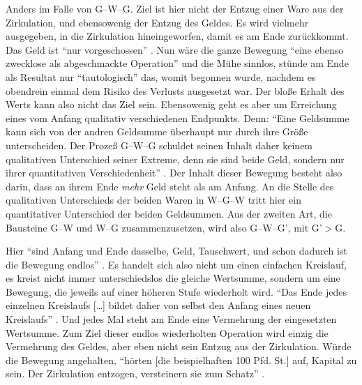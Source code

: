 \documentclass[12pt,
               DIV13,
               paper=a4,
               twoside=false,
               onehalfspacing,
               bibliography=totoc,
               toc=graduated,
               draft,
               ]{scrartcl}
\newcommand{\lips}{\dots\unkern}
\newcommand{\pc}[2]{\parencite[#1]{#2}}
\newcommand{\vgl}[2]{\parencite[vgl.][#1]{#2}}
\newcommand{\worries}[1]{\ifdraft{\textcolor{blue}{\texttt{(#1)}}}{}}
\newcommand{\gwg}{G--W--G'\xspace}
\newcommand{\wgw}{W--G--W\xspace}
\begin{document}
Anders im Falle von G--W--G. Ziel ist hier nicht der Entzug einer Ware
aus der Zirkulation, und ebensowenig der Entzug des Geldes. Es wird
vielmehr ausgegeben, in die Zirkulation hineingeworfen, damit es am
Ende zurückkommt. Das Geld ist "`nur vorgeschossen"' \pc{163}{kap}.
Nun wäre die ganze Bewegung "`eine ebenso zwecklose als abgeschmackte
Operation"' \pc{165}{kap} und die Mühe sinnlos, stünde am Ende als
Resultat nur "`tautologisch"' \pc{164}{kap} das, womit begonnen wurde,
nachdem es obendrein einmal dem Risiko des Verlusts ausgesetzt war.
Der bloße Erhalt des Werts kann also nicht das Ziel sein. Ebensowenig
geht es aber um Erreichung eines vom Anfang qualitativ verschiedenen
Endpunkts. Denn: "`Eine Geldsumme kann sich von der andren Geldsumme
überhaupt nur durch ihre Größe unterscheiden. Der Prozeß G--W--G
schuldet seinen Inhalt daher keinem qualitativen Unterschied seiner
Extreme, denn sie sind beide Geld, sondern nur ihrer quantitativen
Verschiedenheit"' \pc{165}{kap}. Der Inhalt dieser Bewegung besteht
also darin, dass an ihrem Ende \emph{mehr} Geld steht als am Anfang.
An die Stelle des qualitativen Unterschieds der beiden Waren in \wgw
tritt hier ein quantitativer Unterschied der beiden Geldsummen. Aus
der zweiten Art, die Bausteine G--W und W--G zusammenzusetzen, wird
also \gwg, mit G'$>$G.



Hier "`sind Anfang und Ende dasselbe, Geld, Tauschwert, und schon
dadurch ist die Bewegung endlos"' \pc{166}{kap}. Es handelt sich also
nicht um einen einfachen Kreislauf, es kreist nicht immer
unterschiedslos die gleiche Wertsumme, sondern um eine Bewegung, die
jeweils auf einer höheren Stufe wiederholt wird. "`Das Ende jedes
einzelnen Kreislaufs [\lips] bildet daher von selbst den Anfang eines
neuen Kreislaufs"' \pc{S. 166 f.}{kap}. Und jedes Mal steht am Ende
eine Vermehrung der eingesetzten Wertsumme. Zum Ziel dieser endlos
wiederholten Operation wird einzig die Vermehrung des Geldes, aber
eben nicht sein Entzug aus der Zirkulation. Würde die Bewegung
angehalten, "`hörten [die beispielhaften 100 Pfd. St.] auf, Kapital zu
sein. Der Zirkulation entzogen, versteinern sie zum Schatz"'
\pc{166}{kap}.
\end{document}
